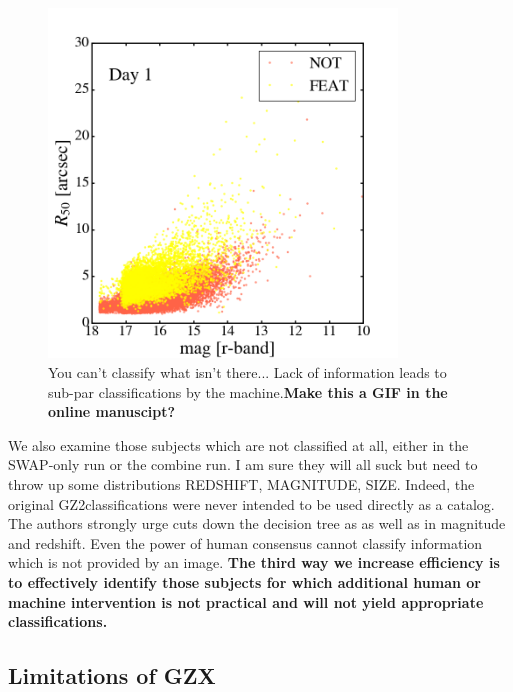 \documentclass[twocolumn]{aastex6}
\begin{document}
\begin{figure}[t!]
\includegraphics[width=3.65in]{figures/GZ2_sup_PLPD5_p5_flipfeature2b_2009-02-25_00:00:00_RF_accuracy_size-mag.png}
\caption{You can't classify what isn't there... Lack of information leads to sub-par classifications by the machine.\textbf{Make this a GIF in the online manuscipt?} \label{fig: machine classified}}
\end{figure}

We also examine those subjects which are not classified at all, either in the SWAP-only
run or the combine run. I am sure they will all suck but need to throw up some distributions
REDSHIFT, MAGNITUDE, SIZE.  Indeed, the original GZ2classifications were never intended 
to be used directly as a catalog. The authors strongly urge cuts down the decision tree as
as well as in magnitude and redshift. Even the power of human consensus  cannot 
classify information which is not provided by an image. \textbf{The third way we increase 
efficiency is to effectively identify those subjects for which additional human or 
machine intervention is not practical and will not yield appropriate classifications.} 


\subsection{Limitations of GZX}
\end{document}
